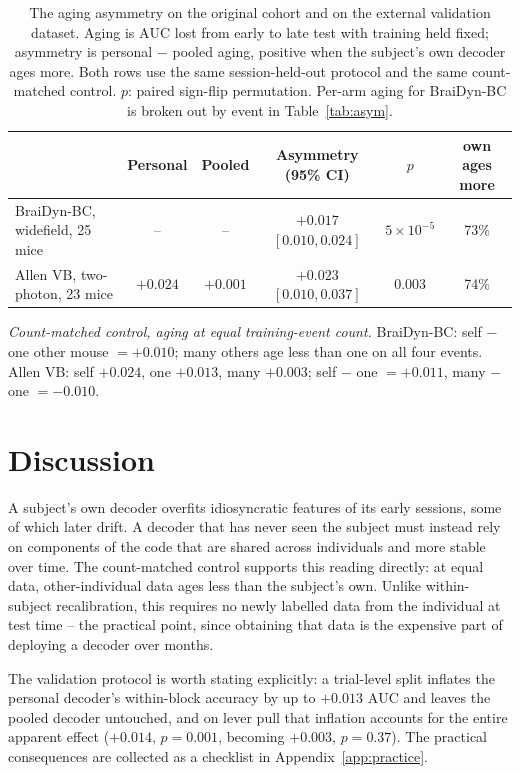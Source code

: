 \documentclass[mlabstract,onecolumn]{jmlr}
\newcommand{\auc}{\mathrm{AUC}}
\begin{document}
\begin{table}[t]\centering
\caption{The aging asymmetry on the original cohort and on the external validation dataset. Aging
is $\auc$ lost from early to late test with training held fixed; asymmetry is personal $-$ pooled
aging, positive when the subject's own decoder ages more. Both rows use the same session-held-out
protocol and the same count-matched control. $p$: paired sign-flip permutation. Per-arm aging for BraiDyn-BC is broken out by event in Table~\ref{tab:asym}.}
\label{tab:allen}
\setlength{\tabcolsep}{2pt}
{\small
\begin{tabular}{lccccc}
\toprule
& Personal & Pooled & Asymmetry (95\% CI) & $p$ & own ages more \\
\midrule
BraiDyn-BC, widefield, 25 mice & -- & -- & $+0.017$ $[0.010, 0.024]$ & $5\times10^{-5}$ & 73\% \\
Allen VB, two-photon, 23 mice & $+0.024$ & $+0.001$ & $+0.023$ $[0.010, 0.037]$ & 0.003 & 74\% \\
\bottomrule
\end{tabular}}

\vspace{3pt}
\begin{minipage}{0.95\linewidth}\small\raggedright
\emph{Count-matched control, aging at equal training-event count.} BraiDyn-BC: self $-$ one other
mouse $= +0.010$; many others age less than one on all four events. Allen VB: self $+0.024$, one
$+0.013$, many $+0.003$; self $-$ one $= +0.011$, many $-$ one $= -0.010$.
\end{minipage}
\end{table}

\section{Discussion}
A subject's own decoder overfits idiosyncratic features of its early sessions, some of which later
drift. A decoder that has never seen the subject must instead rely on components of the code that are
shared across individuals and more stable over time. The count-matched control supports this reading
directly: at equal data, other-individual data ages less than the subject's own. Unlike
within-subject recalibration, this requires no newly labelled data from the individual at test
time -- the practical point, since obtaining that data is the expensive part of deploying a decoder
over months.


The validation protocol is worth stating explicitly: a
trial-level split inflates the personal decoder's within-block accuracy by up to $+0.013$ $\auc$ and
leaves the pooled decoder untouched, and on lever pull that inflation accounts for the entire
apparent effect ($+0.014$, $p = 0.001$, becoming $+0.003$, $p = 0.37$). The practical consequences are collected as a checklist in Appendix~\ref{app:practice}.
\end{document}
